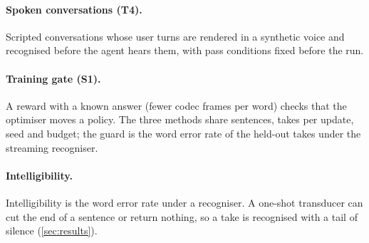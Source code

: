 \paragraph{Spoken conversations (T4).}
Scripted conversations whose user turns are rendered in a synthetic voice and recognised before the agent hears them, with pass conditions fixed before the run.

\paragraph{Training gate (S1).}
A reward with a known answer (fewer codec frames per word) checks that the optimiser moves a policy. The three methods share sentences, takes per update, seed and budget; the guard is the word error rate of the held-out takes under the streaming recogniser.

\paragraph{Intelligibility.}
Intelligibility is the word error rate under a recogniser. A one-shot transducer can cut the end of a sentence or return nothing, so a take is recognised with a tail of silence (\cref{sec:results}).
